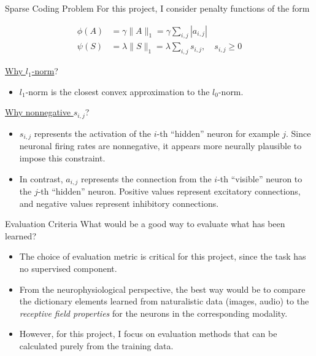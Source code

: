 \documentclass{beamer}
\begin{document}
\begin{frame}{Sparse Coding Problem}
For this project, I consider penalty functions of the form

\begin{beamerboxesrounded}[lower=lowyellow,upper=upyellow,shadow=true]{}
\begin{align*}
\phi(A) &= \gamma \| A \|_1 = \gamma \sum_{i,j} | a_{i,j} | \\
\psi(S) &= \lambda \| S \|_1 = \lambda \sum_{i,j} s_{i,j}, \quad s_{i,j} \ge 0
\end{align*}
\end{beamerboxesrounded}


\underline{Why $l_1$-norm}? 

\begin{itemize}
	\item $l_1$-norm is the closest convex approximation to the $l_0$-norm.
\end{itemize}

\underline{Why nonnegative $s_{i,j}$}? 
\begin{itemize}
	\item $s_{i,j}$ represents the activation of the $i$-th ``hidden'' neuron for example $j$.  Since neuronal firing rates are nonnegative, it appears more neurally plausible to impose this constraint.
	\item In contrast, $a_{i,j}$ represents the connection from the $i$-th ``visible'' neuron to the $j$-th ``hidden'' neuron.  Positive values represent excitatory connections, and negative values represent inhibitory connections.
\end{itemize}
\end{frame}

\begin{frame}{Evaluation Criteria}
What would be a good way to evaluate what has been learned?

\begin{itemize}
	\item The choice of evaluation metric is critical for this project, since the task has no supervised component.

	\item From the neurophysiological perspective, the best way would be to compare the dictionary elements learned from naturalistic data (images, audio) to the \emph{receptive field properties} for the neurons in the corresponding modality.

	\item However, for this project, I focus on evaluation methods that can be calculated purely from the training data.
\end{itemize}


\end{frame}
\end{document}
